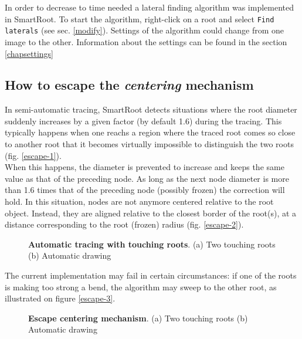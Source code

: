 \documentclass[a4paper,english,10pt]{report}
\begin{document}
In order to decrease to time needed a lateral finding algorithm was implemented in SmartRoot. To start the algorithm, right-click on a root and select \verb|Find laterals| (see sec. \ref{modify}). Settings of the algorithm could change from one image to the other. Information about the settings can be found in the section \ref{chapsettings}


\subsection{How to escape the \textit{centering} mechanism}

In semi-automatic tracing, SmartRoot detects situations where the root diameter suddenly increases by a given factor (by default 1.6) during the tracing. This typically happens when one reachs a region where the traced root comes so close to another root that it becomes virtually impossible to distinguish the two roots (fig. \ref{escape-1}).\\

When this happens, the diameter is prevented to increase and keeps the same value as that of the preceding node. As long as the next node diameter is more than 1.6 times that of the preceding node (possibly frozen) the correction will hold. In this situation, nodes are not anymore centered relative to the root object. Instead, they are aligned relative to the closest border of the root(s), at a distance corresponding to the root (frozen) radius (fig. \ref{escape-2}).\\

\begin{figure}[h]
\centering
  \hspace{10mm}   
\caption[Touching roots]{\textbf{Automatic tracing with touching roots}. (a) Two touching roots (b) Automatic drawing}
\label{2roots}
\end{figure}

The current implementation may fail in certain circumstances: if one of the roots is making too strong a bend, the algorithm may sweep to the other root, as illustrated on figure \ref{escape-3}.\\

\begin{figure}[h]
\centering
  \hspace{10mm}   
\caption[Escape centering]{\textbf{Escape centering mechanism}. (a) Two touching roots (b) Automatic drawing}
\label{escape}
\end{figure}
\end{document}
